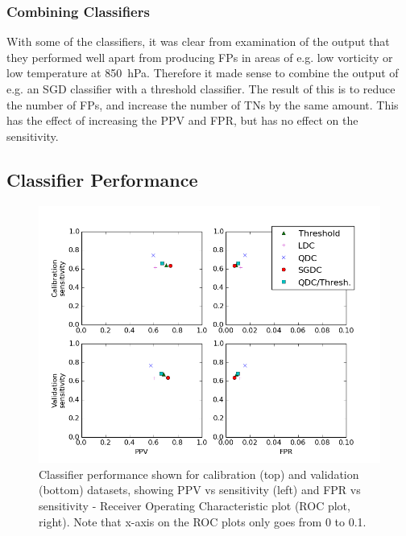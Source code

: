 \documentclass[pdftex,12pt,a4paper]{report}
\begin{document}
\subsubsection{Combining Classifiers}
With some of the classifiers, it was clear from examination of the output that they performed well
apart from producing FPs in areas of e.g. low vorticity or low temperature at \SI{850}{hPa}.
Therefore it made sense to combine the output of e.g. an SGD classifier with a threshold classifier.
The result of this is to reduce the number of FPs, and increase the number of TNs by the same
amount. This has the effect of increasing the PPV and FPR, but has no effect on the sensitivity.

\subsection{Classifier Performance}


\begin{figure}[hb!]
    \centering
    \includegraphics[width=\textwidth]{figures/ppv_and_fpr_vs_sens}
    \caption{Classifier performance shown for calibration (top) and validation (bottom) datasets,
        showing PPV vs sensitivity (left) and FPR vs sensitivity - Receiver Operating Characteristic
        plot (ROC plot, right). Note that x-axis on the ROC plots only goes from 0 to 0.1. }
    \label{fig:ppv_and_fpr_vs_sens}
\end{figure}
\end{document}
